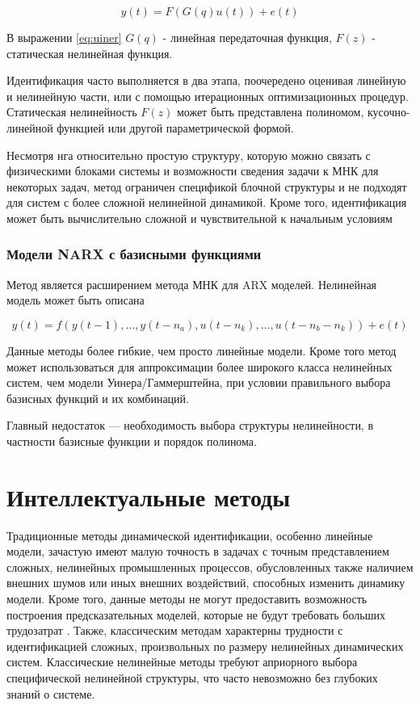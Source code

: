 \begin{equation}
  y(t)=F(G(q)u(t))+e(t)
  \label{eq:uiner}
\end{equation}

В выражении \ref{eq:uiner} $G(q)$ - линейная передаточная функция, $F(z)$ -
статическая нелинейная функция. 

Идентификация часто выполняется в два этапа, поочередено оценивая линейную и
нелинейную части, или с помощью итерационных оптимизационных процедур.
Статическая нелинейность $F(z)$ может быть представлена полиномом, 
кусочно-линейной функцией или другой параметрической формой.

Несмотря нга относительно простую структуру, которую можно связать с
физическими блоками системы и возможности сведения задачи к МНК для некоторых
задач, метод ограничен спецификой блочной структуры и не подходят для систем с
более сложной нелинейной динамикой. Кроме того, идентификация может быть
вычислительно сложной и чувствительной к начальным условиям

\subsubsection{Модели NARX с базисными функциями}

Метод является расширением метода МНК для ARX моделей. Нелинейная модель может быть описана

\begin{equation}
  y(t)=f(y(t-1),\dots,y(t-n_a),u(t-n_k),\dots,u(t-n_b-n_k))+e(t)
  \label{eq:narx}
\end{equation}


Данные методы более гибкие, чем просто линейные модели. Кроме того метод может
использоваться для аппроксимации более широкого класса нелинейных
систем, чем модели Уинера/Гаммерштейна, при условии правильного выбора базисных
функций и их комбинаций. 

Главный недостаток — необходимость выбора структуры нелинейности, в частности
базисные функции и порядок полинома. 

\section{Интеллектуальные методы}

Традиционные методы динамической идентификации, особенно линейные модели,
зачастую имеют малую точность в задачах с точным представлением сложных,
нелинейных промышленных процессов, обусловленных также наличием внешних шумов
или иных внешних воздействий, способных изменить динамику модели. Кроме того, 
данные методы не могут предоставить возможность построения предсказательных 
моделей, которые не будут требовать больших трудозатрат 
\cite{bib:ident:neural:transformers}. Также, классическим методам характерны 
трудности с идентификацией сложных, произвольных по размеру нелинейных 
динамических систем. Классические нелинейные методы требуют априорного выбора 
специфической нелинейной структуры, что часто невозможно без глубоких знаний 
о системе. 

